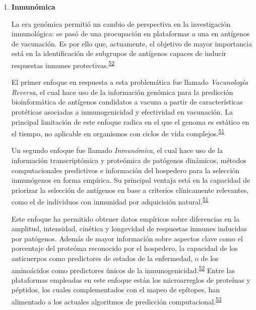 \documentclass[]{article}
\begin{document}
\begin{enumerate}
  \begin{enumerate}
  \def\labelenumii{\roman{enumii}.}
  \item
    \textbf{Inmunómica}

    La era genómica permitió un cambio de perspectiva en la
    investigación inmunológica: se pasó de una procupación en
    plataformas a una en antígenos de vacunación. Es por ello que,
    actuamente, el objetivo de mayor importancia está en la
    identificación de subgrupos de antígenos capaces de inducir
    respuestas inmunes
    protectivas.\textsuperscript{\protect\hyperlink{ref-Davies2015Large}{52}}

    El primer enfoque en respuesta a esta problemática fue llamado
    \emph{Vacunología Reversa}, el cual hace uso de la información
    genómica para la predicción bioinformática de antígenos candidatos a
    vacuna a partir de características protéticas asociadas a
    inmunogenicidad y efectividad en vacunación. La principal limitación
    de este enfoque radica en el que el genoma es estático en el tiempo,
    no aplicable en organismos con ciclos de vida
    complejos.\textsuperscript{\protect\hyperlink{ref-immunomics2016}{51}}

    Un segundo enfoque fue llamado \emph{Inmunómica}, el cual hace uso
    de la información transcriptómica y proteómica de patógenos
    dinámicos, métodos computacionales predictivos e información del
    hospedero para la selección inmunógenos en forma empírica. Su
    principal ventaja está en la capacidad de priorizar la selección de
    antígenos en base a criterios clínicamente relevantes, como el de
    individuos con inmunidad por adquicisión
    natural.\textsuperscript{\protect\hyperlink{ref-immunomics2016}{51}}

    Este enfoque ha permitido obtener datos empíricos sobre diferencias
    en la amplitud, intensidad, cinética y longevidad de respuestas
    inmunes inducidas por patógenos. Además de mayor información sobre
    aspectos clave como el porcentaje del proteóma reconocido por el
    hospedero, la capacidad de los anticuerpos como predictores de
    estados de la enfermedad, o de los aminoácidos como predictores
    únicos de la
    inmunogenicidad.\textsuperscript{\protect\hyperlink{ref-Davies2015Large}{52}}
    Entre las plataformas empleadas en este enfoque están los
    microarreglos de proteínas y péptidos, los cuales complementados con
    el mapeo de epítopes, han alimentado a los actuales algoritmos de
    predicción
    computacional.\textsuperscript{\protect\hyperlink{ref-carmona2015peptide}{53}}
  \end{enumerate}
\end{enumerate}
\end{document}
